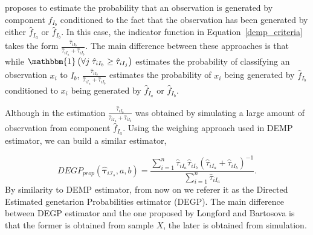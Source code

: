 \documentclass[10pt, a4paper]{article}
\newcommand{\m}[1]{\boldsymbol{#1}}
\begin{document}
\cite{longford2014} proposes to estimate the probability that an observation is generated by component $\hat{f}_{I_b}$ conditioned to the fact that the observation has been generated by either $\hat{f}_{I_a}$ or $\hat{f}_{I_b}$. In this case, the indicator function in Equation~\ref{demp_criteria} takes the form $\frac{\hat{\tau}_{iI_b}}{\hat{\tau}_{iI_a} + \hat{\tau}_{iI_b}}$. The main difference between these approaches is that while $\mathbbm{1}\left( \forall j\; \hat{\tau}_{i I_{b}} \geq \hat{\tau}_{iI_j} \right)$ estimates the probability of classifying an observation $x_i$ to $I_b$, $\frac{\hat{\tau}_{iI_b}}{\hat{\tau}_{iI_a} + \hat{\tau}_{iI_b}}$ estimates the probability of $x_i$ being generated by $\hat{f}_{I_b}$ conditioned to $x_i$  being generated by $\hat{f}_{I_a}$ or $\hat{f}_{I_b}$.

Although in  \cite{longford2014} the estimation $\frac{\hat{\tau}_{iI_b}}{\hat{\tau}_{iI_a} + \hat{\tau}_{iI_b}}$ was obtained by simulating a large amount of observation from component $\hat{f}_{I_a}$. Using the weighing approach used in DEMP estimator, we can build a similar estimator, 

\begin{equation}\label{demp2_criteria}
DEGP_{prop}(\hat{\m \tau}_{i \mathcal{I}_s}, a, b) =\frac{ \sum_{i=1}^n \hat{\tau}_{iI_a} \hat{\tau}_{iI_b}(\hat{\tau}_{iI_a} + \hat{\tau}_{iI_b})^{-1}  }{\sum_{i=1}^n \hat{\tau}_{iI_a} }.
\end{equation}
By similarity to DEMP estimator, from now on we referer it as the Directed Estimated genetarion Probabilities estimator (DEGP). The main difference between DEGP estimator and the one proposed by Longford and Bartosova is that the former is obtained from sample $X$, the later is obtained from simulation.





%
%
%
%
%
\end{document}
